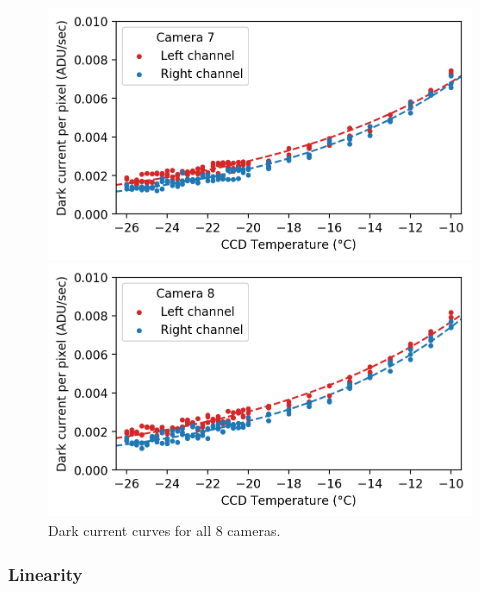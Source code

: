 \begin{colsection}
\begin{colsection}
\begin{figure}[p]
\begin{center}
        \begin{minipage}[t]{0.49\textwidth}\vspace{10pt}
            \includegraphics[width=\linewidth]{images/detectors/dc_7.png}
        \end{minipage}
        \begin{minipage}[t]{0.49\textwidth}\vspace{10pt}
            \includegraphics[width=\linewidth]{images/detectors/dc_8.png}
        \end{minipage}
    \end{center}
    \caption[Dark current curves for all 8 cameras]{
        Dark current curves for all 8 cameras.
        }\label{fig:dcs}
\end{figure}

\clearpage

\newpage
\subsubsection{Linearity}


\end{colsection}
\end{colsection}
